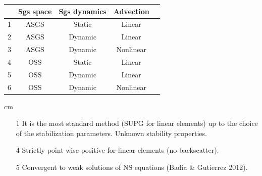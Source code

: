 \begin{frame}[t]
\begin{table}[h]
\centering
\begin{tabular}{|c|c|c|c|c|}
\hline
& Sgs space & Sgs dynamics  &  Advection\\
\hline
1&ASGS      & Static  &  Linear    \\
2&ASGS      & Dynamic &  Linear    \\
3&ASGS      & Dynamic &  Nonlinear \\
\hline
4&OSS      & Static  &  Linear   \\
5&OSS      & Dynamic &  Linear   \\
6&OSS      & Dynamic &  Nonlinear \\
\hline
\end{tabular}
\end{table}
 cm
\begin{itemize}
\item[1] It is the most standard method (SUPG for linear elements) up to the choice of the
stabilization parameters. Unknown stability properties.
\item[4] Strictly point-wise positive for linear elements (no backscatter).
\item[5] Convergent to weak solutions of NS equations (Badia \& Gutierrez 2012).
\end{itemize}
\end{frame}
\addtocounter{framenumber}{-1}

\addtocounter{framenumber}{-1}
